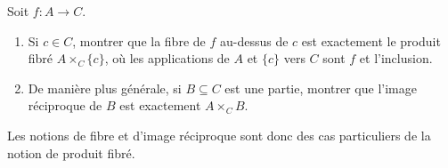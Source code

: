 \begin{exercice}
Soit $f : A\to C$.
\begin{enumerate}
\item Si $c\in C$, montrer que la fibre de $f$ au-dessus de $c$ est exactement le produit fibré $A\times_C \{c\}$, où les applications de $A$ et $\{c\}$ vers $C$ sont $f$ et l'inclusion.
\item De manière plus générale, si $B\subseteq C$ est une partie, montrer que l'image réciproque de $B$ est exactement $A\times_C B$.
\end{enumerate}
Les notions de fibre et d'image réciproque sont donc des cas particuliers de la notion de produit fibré.
\end{exercice}



